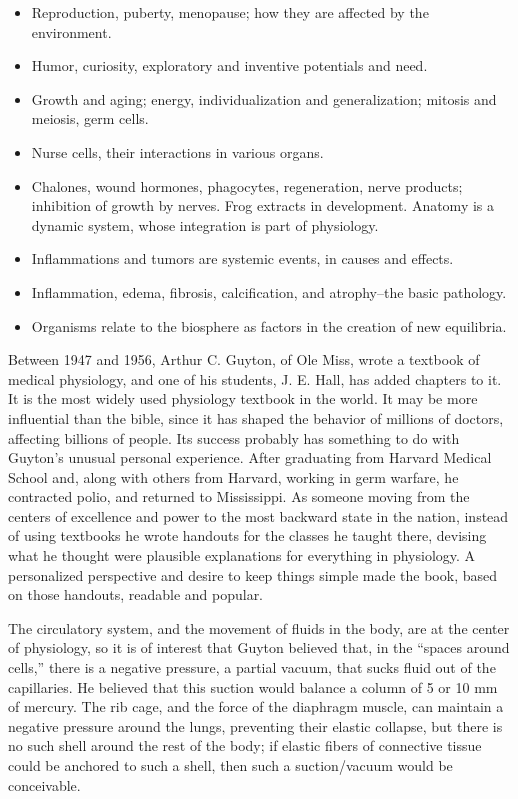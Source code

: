 \documentclass{article}
\begin{document}
\begin{itemize}
    \item Reproduction, puberty, menopause; how they are affected by the environment.
    \item Humor, curiosity, exploratory and inventive potentials and need.
    \item Growth and aging; energy, individualization and generalization; mitosis and meiosis, germ cells.
    \item Nurse cells, their interactions in various organs.
    \item Chalones, wound hormones, phagocytes, regeneration, nerve products; inhibition of growth by nerves. Frog extracts in development. Anatomy is a dynamic system, whose integration is part of physiology.
    \item Inflammations and tumors are systemic events, in causes and effects.
    \item Inflammation, edema, fibrosis, calcification, and atrophy--the basic pathology.
    \item Organisms relate to the biosphere as factors in the creation of new equilibria.
\end{itemize}

Between 1947 and 1956, Arthur C. Guyton, of Ole Miss, wrote a textbook of medical physiology, and one of his students, J. E. Hall, has added chapters to it. It is the most widely used physiology textbook in the world. It may be more influential than the bible, since it has shaped the behavior of millions of doctors, affecting billions of people. Its success probably has something to do with Guyton’s unusual personal experience. After graduating from Harvard Medical School and, along with others from Harvard, working in germ warfare, he contracted polio, and returned to Mississippi. As someone moving from the centers of excellence and power to the most backward state in the nation, instead of using textbooks he wrote handouts for the classes he taught there, devising what he thought were plausible explanations for everything in physiology. A personalized perspective and desire to keep things simple made the book, based on those handouts, readable and popular.

The circulatory system, and the movement of fluids in the body, are at the center of physiology, so it is of interest that Guyton believed that, in the “spaces around cells,” there is a negative pressure, a partial vacuum, that sucks fluid out of the capillaries. He believed that this suction would balance a column of 5 or 10 mm of mercury. The rib cage, and the force of the diaphragm muscle, can maintain a negative pressure around the lungs, preventing their elastic collapse, but there is no such shell around the rest of the body; if elastic fibers of connective tissue could be anchored to such a shell, then such a suction/vacuum would be conceivable.
\end{document}
